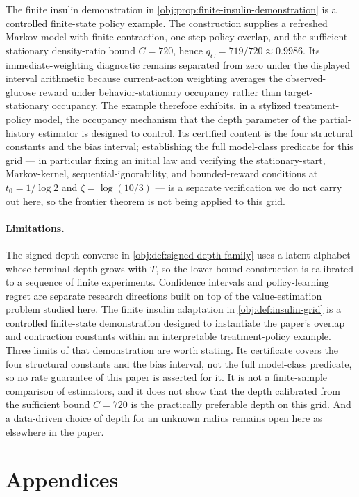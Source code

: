 \documentclass[11pt]{article}
\begin{document}
The finite insulin demonstration in \cref{obj:prop:finite-insulin-demonstration} is a controlled finite-state policy example. The construction supplies a refreshed Markov model with finite contraction, one-step policy overlap, and the sufficient stationary density-ratio bound \(C=720\), hence \(q_C=719/720\approx0.9986\). Its immediate-weighting diagnostic remains separated from zero under the displayed interval arithmetic because current-action weighting averages the observed-glucose reward under behavior-stationary occupancy rather than target-stationary occupancy. The example therefore exhibits, in a stylized treatment-policy model, the occupancy mechanism that the depth parameter of the partial-history estimator is designed to control. Its certified content is the four structural constants and the bias interval; establishing the full model-class predicate for this grid --- in particular fixing an initial law and verifying the stationary-start, Markov-kernel, sequential-ignorability, and bounded-reward conditions at \(t_0=1/\log2\) and \(\zeta=\log(10/3)\) --- is a separate verification we do not carry out here, so the frontier theorem is not being applied to this grid.

\paragraph{Limitations.}
The signed-depth converse in \cref{obj:def:signed-depth-family} uses a latent alphabet whose terminal depth grows with \(T\), so the lower-bound construction is calibrated to a sequence of finite experiments. Confidence intervals and policy-learning regret are separate research directions built on top of the value-estimation problem studied here. The finite insulin adaptation in \cref{obj:def:insulin-grid} is a controlled finite-state demonstration designed to instantiate the paper's overlap and contraction constants within an interpretable treatment-policy example. Three limits of that demonstration are worth stating. Its certificate covers the four structural constants and the bias interval, not the full model-class predicate, so no rate guarantee of this paper is asserted for it. It is not a finite-sample comparison of estimators, and it does not show that the depth calibrated from the sufficient bound \(C=720\) is the practically preferable depth on this grid. And a data-driven choice of depth for an unknown radius remains open here as elsewhere in the paper.


\appendix

\section*{Appendices}
\end{document}
